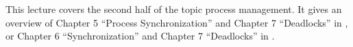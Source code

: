 This lecture covers the second half of the topic process management.
It gives an overview of Chapter 5 ``Process Synchronization'' and Chapter 
7 ``Deadlocks'' in \cite{Silberschatz2013intl,Silberschatz2013osc}, or Chapter 
6 ``Synchronization'' and Chapter 7 ``Deadlocks'' in 
\cite{Silberschatz2009osc}.
